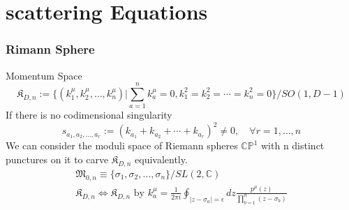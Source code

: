 \documentclass[aspectratio=169]{beamer}%
\begin{document}
	\section{scattering Equations}
	
	\begin{frame}
		\frametitle{Rimann Sphere}
		Momentum Space
		\begin{equation}
			\mathfrak{K}_{D,n}:=\{(k_1^\mu,k_2^\mu,\ldots,k_n^\mu)|\sum_{a=1}^nk_a^\mu=0,k_1^2=k_2^2=\cdots=k_n^2=0\}/SO(1,D-1)
		\end{equation}
		If there is no codimensional singularity
		\begin{equation}
			s_{a_1,a_2,...,a_r}:=(k_{a_1}+k_{a_2}+\cdots+k_{a_r})^2\neq 0,\quad \forall r=1,\ldots,n
		\end{equation}
		We can consider the moduli space of Riemann spheres $\mathbb{CP}^1$ with n distinct punctures on it to carve $\mathfrak{K}_{D,n}$ equivalently.
	\begin{equation}
		\label{3}
		\begin{gathered}
				\mathfrak{M}_{0,n}\equiv \{\sigma_1,\sigma_2,\ldots,\sigma_n\}/ SL(2,\mathbb{C})\\
			\mathfrak{K}_{D,n}\iff \mathfrak{K}_{D,n} \text{~by~} k_a^\mu=\frac1{2\pi i}\oint_{|z-\sigma_a|=\epsilon}dz\frac{p^\mu(z)}{\prod_{b=1}^n(z-\sigma_b)}
		\end{gathered}
	\end{equation}
	\end{frame}
	
\end{document}
